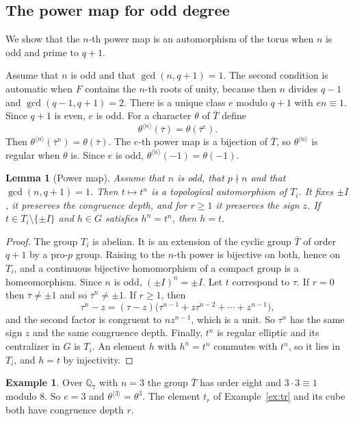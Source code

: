 \documentclass[12pt,letterpaper]{article}
\numberwithin{equation}{section}
\newtheorem{lemma}[theorem]{Lemma}
\theoremstyle{definition}
\newtheorem{example}[theorem]{Example}
\theoremstyle{remark}
\begin{document}
\subsection*{The power map for odd degree}
We show that the $n$-th power map is an automorphism of the torus when $n$ is odd and prime to $q+1$.

Assume that $n$ is odd and that $\gcd(n,q+1)=1$. The second condition is automatic when $F$ contains the $n$-th roots of unity, because then $n$ divides $q-1$ and $\gcd(q-1,q+1)=2$. There is a unique class $e$ modulo $q+1$ with $en\equiv1$. Since $q+1$ is even, $e$ is odd. For a character $\theta$ of $\bar T$ define
\begin{equation}\label{eq:theta-power}
 \theta^{\langle n\rangle}(\bar\tau)=\theta(\bar\tau^{e}).
\end{equation}
Then $\theta^{\langle n\rangle}(\bar\tau^n)=\theta(\bar\tau)$. The $e$-th power map is a bijection of $\bar T$, so $\theta^{\langle n\rangle}$ is regular when $\theta$ is. Since $e$ is odd, $\theta^{\langle n\rangle}(-1)=\theta(-1)$.

\begin{lemma}[Power map]\label{lem:power}
Assume that $n$ is odd, that $p\nmid n$ and that $\gcd(n,q+1)=1$. Then $t\mapsto t^n$ is a topological automorphism of $T_i$. It fixes $\pm I$, it preserves the congruence depth, and for $r\ge1$ it preserves the sign $z$. If $t\in T_i\setminus\{\pm I\}$ and $h\in G$ satisfies $h^n=t^n$, then $h=t$.
\end{lemma}
\begin{proof}
The group $T_i$ is abelian. It is an extension of the cyclic group $\bar T$ of order $q+1$ by a pro-$p$ group. Raising to the $n$-th power is bijective on both, hence on $T_i$, and a continuous bijective homomorphism of a compact group is a homeomorphism. Since $n$ is odd, $(\pm I)^n=\pm I$. Let $t$ correspond to $\tau$. If $r=0$ then $\bar\tau\ne\pm1$ and so $\bar\tau^n\ne\pm1$. If $r\ge1$, then
\[
 \tau^n-z=(\tau-z)\bigl(\tau^{n-1}+z\tau^{n-2}+\cdots+z^{n-1}\bigr),
\]
and the second factor is congruent to $nz^{n-1}$, which is a unit. So $\tau^n$ has the same sign $z$ and the same congruence depth. Finally, $t^n$ is regular elliptic and its centralizer in $G$ is $T_i$. An element $h$ with $h^n=t^n$ commutes with $t^n$, so it lies in $T_i$, and $h=t$ by injectivity.
\end{proof}

\begin{example}
Over $\mathbb Q_7$ with $n=3$ the group $\bar T$ has order eight and $3\cdot3\equiv1$ modulo $8$. So $e=3$ and $\theta^{\langle3\rangle}=\theta^3$. The element $t_r$ of Example~\ref{ex:tr} and its cube both have congruence depth $r$.
\end{example}
\end{document}
